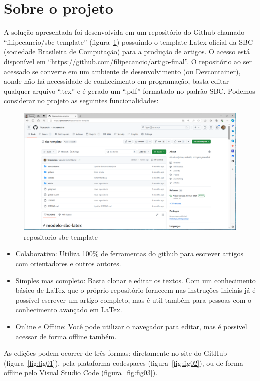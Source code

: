 \section{Sobre o projeto}

A solução apresentada foi desenvolvida em um repositório do Github chamado ``filipecancio/sbc-template'' (figura~\ref{fig:fig10}) possuindo o template Latex oficial da SBC (sociedade Brasileira de Computação) para a produção de artigos. O acesso está disponível em ``https://github.com/filipecancio/artigo-final''. O repositório ao ser acessado se converte em um ambiente de desenvolvimento (ou Devcontainer), aonde não há necessidade de conhecimento em programação, basta editar qualquer arquivo ``.tex'' e é gerado um ``.pdf'' formatado no padrão SBC. Podemos considerar no projeto as seguintes funcionalidades:

\begin{figure}[ht]
	\centering
	\includegraphics[width=.7\textwidth]{./images/fig10.png}
	\caption{repositorio sbc-template}
	\label{fig:fig10}
\end{figure}

\begin{itemize}
	\item Colaborativo: Utiliza 100\% de ferramentas do github para escrever artigos com orientadores e outros autores.
	\item Simples mas completo: Basta clonar e editar os textos. Com um conhecimento básico de LaTex que o próprio repositório fornecem nas instruções iniciais já é possível escrever um artigo completo, mas é util também para pessoas com o conhecimento avançado em LaTex.
	\item Online e Offline: Você pode utilizar o navegador para editar, mas é possivel acessar de forma offline também.
\end{itemize}


As edições podem ocorrer de três formas: diretamente no site do GitHub (figura~\ref{fig:fig01}), pela plataforma codespaces (figura~\ref{fig:fig02}), ou de forma offline pelo Visual Studio Code (figura~\ref{fig:fig03}).


